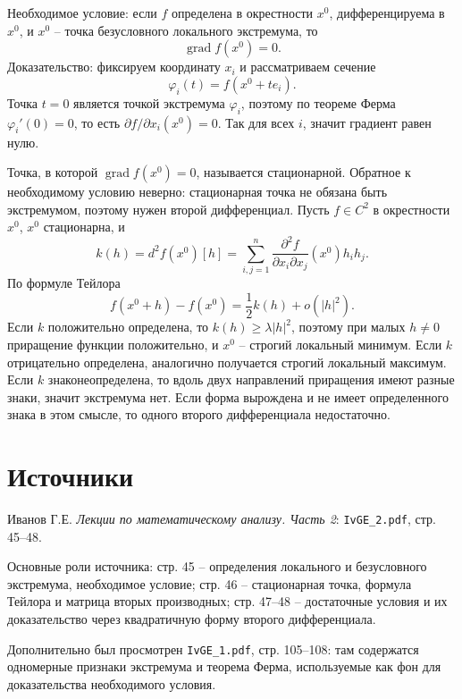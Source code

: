 \documentclass[12pt,a4paper]{article}
\newcommand{\grad}{\operatorname{grad}}
\begin{document}
Необходимое условие: если \(f\) определена в окрестности \(x^0\),
дифференцируема в \(x^0\), и \(x^0\) -- точка безусловного локального
экстремума, то
\[
  \grad f(x^0)=0.
\]
Доказательство: фиксируем координату \(x_i\) и рассматриваем сечение
\[
  \varphi_i(t)=f(x^0+t e_i).
\]
Точка \(t=0\) является точкой экстремума \(\varphi_i\), поэтому по теореме
Ферма \(\varphi_i'(0)=0\), то есть
\(\partial f/\partial x_i(x^0)=0\). Так для всех \(i\), значит градиент равен
нулю.

Точка, в которой \(\grad f(x^0)=0\), называется стационарной. Обратное к
необходимому условию неверно: стационарная точка не обязана быть экстремумом,
поэтому нужен второй дифференциал. Пусть \(f\in C^2\) в окрестности
\(x^0\), \(x^0\) стационарна, и
\[
  k(h)=d^2 f(x^0)[h]
  =
  \sum_{i,j=1}^n
  \frac{\partial^2 f}{\partial x_i\partial x_j}(x^0)h_i h_j.
\]
По формуле Тейлора
\[
  f(x^0+h)-f(x^0)=\frac12 k(h)+o(|h|^2).
\]
Если \(k\) положительно определена, то \(k(h)\ge\lambda |h|^2\), поэтому при
малых \(h\ne0\) приращение функции положительно, и \(x^0\) -- строгий
локальный минимум. Если \(k\) отрицательно определена, аналогично получается
строгий локальный максимум. Если \(k\) знаконеопределена, то вдоль двух
направлений приращения имеют разные знаки, значит экстремума нет. Если форма
вырождена и не имеет определенного знака в этом смысле, то одного второго
дифференциала недостаточно.

\section*{Источники}

Иванов Г.Е. \emph{Лекции по математическому анализу. Часть 2}:
\texttt{IvGE\_2.pdf}, стр. 45--48.

Основные роли источника: стр. 45 -- определения локального и безусловного
экстремума, необходимое условие; стр. 46 -- стационарная точка, формула
Тейлора и матрица вторых производных; стр. 47--48 -- достаточные условия и
их доказательство через квадратичную форму второго дифференциала.

Дополнительно был просмотрен \texttt{IvGE\_1.pdf}, стр. 105--108: там
содержатся одномерные признаки экстремума и теорема Ферма, используемые как
фон для доказательства необходимого условия.
\end{document}
